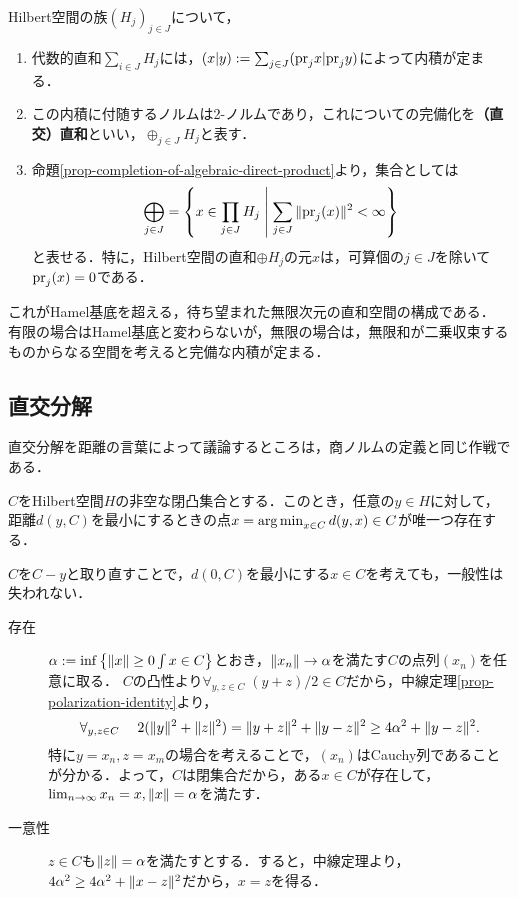 \documentclass[uplatex,dvipdfmx]{jsreport}
\begin{document}
\begin{definition}\label{def-orthogonal-sum-of-Hilbert-spaces}
    Hilbert空間の族$(H_j)_{j\in J}$について，
    \begin{enumerate}
        \item 代数的直和$\sum_{i\in J}H_j$には，$(x|y):=\sum_{j\in J}(\mathrm{pr}_jx|\mathrm{pr}_jy)$によって内積が定まる．
        \item この内積に付随するノルムは2-ノルムであり，これについての完備化を\textbf{（直交）直和}といい，$\oplus_{j\in J}H_j$と表す．
        \item 命題\ref{prop-completion-of-algebraic-direct-product}より，集合としては
        \[\bigoplus_{j\in J}=\left\{x\in\prod_{j\in J}H_j\;\middle|\;\sum_{j\in J}\|\mathrm{pr}_j(x)\|^2<\infty\right\}\]
        と表せる．特に，Hilbert空間の直和$\oplus H_j$の元$x$は，可算個の$j\in J$を除いて$\mathrm{pr}_j(x)=0$である．
    \end{enumerate}
\end{definition}
\begin{remarks}
    これがHamel基底を超える，待ち望まれた無限次元の直和空間の構成である．
    有限の場合はHamel基底と変わらないが，無限の場合は，無限和が二乗収束するものからなる空間を考えると完備な内積が定まる．
\end{remarks}

\subsection{直交分解}

\begin{tcolorbox}[colframe=ForestGreen, colback=ForestGreen!10!white,breakable,colbacktitle=ForestGreen!40!white,coltitle=black,fonttitle=\bfseries\sffamily,
title=]
    直交分解を距離の言葉によって議論するところは，商ノルムの定義と同じ作戦である．
\end{tcolorbox}

\begin{lemma}
    $C$をHilbert空間$H$の非空な閉凸集合とする．このとき，任意の$y\in H$に対して，距離$d(y,C)$を最小にするときの点$x=\operatorname*{arg\,min}_{x\in C}d(y,x)\in C$が唯一つ存在する．
\end{lemma}
\begin{Proof}
    $C$を$C-y$と取り直すことで，$d(0,C)$を最小にする$x\in C$を考えても，一般性は失われない．
    \begin{description}
        \item[存在] $\alpha:=\inf\left\{\|x\|\ge0\int x\in C\right\}$とおき，$\|x_n\|\to\alpha$を満たす$C$の点列$(x_n)$を任意に取る．
        $C$の凸性より$\forall_{y,z\in C}\;(y+z)/2\in C$だから，中線定理\ref{prop-polarization-identity}より，
        \[\forall_{y,z\in C}\;\quad2(\|y\|^2+\|z\|^2)=\|y+z\|^2+\|y-z\|^2\ge4\alpha^2+\|y-z\|^2.\]
        特に$y=x_n,z=x_m$の場合を考えることで，$(x_n)$はCauchy列であることが分かる．よって，$C$は閉集合だから，ある$x\in C$が存在して，$\lim_{n\to\infty}x_n=x,\|x\|=\alpha$を満たす．
        \item[一意性] $z\in C$も$\|z\|=\alpha$を満たすとする．すると，中線定理より，$4\alpha^2\ge4\alpha^2+\|x-z\|^2$だから，$x=z$を得る．
    \end{description}
\end{Proof}
\end{document}
